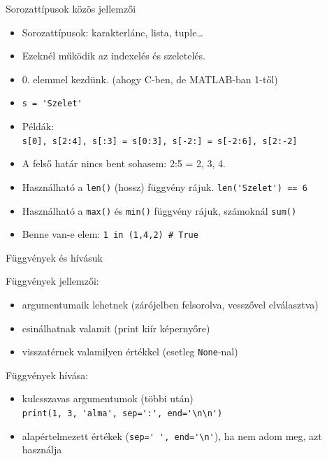 \begin{frame}[fragile]
  {Sorozattípusok közös jellemzői}
  \begin{itemize}
    \item <+-| alert@+> Sorozattípusok: karakterlánc, lista,
        tuple\ldots
    \item <+-| alert@+> Ezeknél működik az indexelés és szeletelés.
    \item <+-| alert@+> 0. elemmel kezdünk. (ahogy C-ben, de MATLAB-ban
        1-től)
    \item <+-| alert@+> \verb!s = 'Szelet'! \\
    \item <+-| alert@+> Példák:\\
        \hspace{-3em}
	\verb!s[0], s[2:4], s[:3] = s[0:3], s[-2:] = s[-2:6], s[2:-2]!
    \item <+-| alert@+> A felső határ nincs bent sohasem: 2:5 = 2, 3, 4.
    \item <+-| alert@+> Használható a \verb!len()! (hossz) függvény
        rájuk. \verb!len('Szelet') == 6!
    \item <+-| alert@+> Használható a \verb!max()! és \verb!min()!
	függvény rájuk, számoknál \verb!sum()!
    \item <+-| alert@+> Benne van-e elem: \verb!1 in (1,4,2) # True!
  \end{itemize}
\end{frame}

\begin{frame}[fragile]
    {Függvények és hívásuk}

    Függvények jellemzői:
    \begin{itemize}
        \item argumentumaik lehetnek (zárójelben felsorolva, vesszővel
            elválasztva)
        \item csinálhatnak valamit (print kiír képernyőre)
        \item visszatérnek valamilyen értékkel (esetleg \verb!None!-nal)
    \end{itemize}

    Függvények hívása:
    \begin{itemize}
        \item kulcsszavas argumentumok (többi után)\\
            \verb!print(1, 3, 'alma', sep=':', end='\n\n')!
        \item alapértelmezett értékek (\verb!sep=' ', end='\n'!), ha nem adom meg, azt
            használja
    \end{itemize}
\end{frame}

